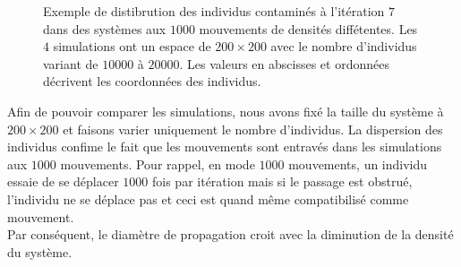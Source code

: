 \begin{figure}[h]
	\caption[Positions des individus : 1000 mouvements, densité variable]{Exemple de distibrution des individus contaminés à l'itération $7$ dans des systèmes aux $1000$ mouvements de densités diffétentes. Les $4$ simulations ont un espace de $200 \times 200$ avec le nombre d'individus variant de $10000$ à $20000$. Les valeurs en abscisses et ordonnées décrivent les coordonnées des individus.}
\end{figure}

Afin de pouvoir comparer les simulations, nous avons fixé la taille du système à $200 \times 200$ et faisons varier uniquement le nombre d'individus. La dispersion des individus confime le fait que les mouvements sont entravés dans les simulations aux $1000$ mouvements. Pour rappel, en mode $1000$ mouvements, un individu essaie de se déplacer $1000$ fois par itération mais si le passage est obstrué, l'individu ne se déplace pas et ceci est quand même compatibilisé comme mouvement.\\

Par conséquent, le diamètre de propagation croit avec la diminution de la densité du système.